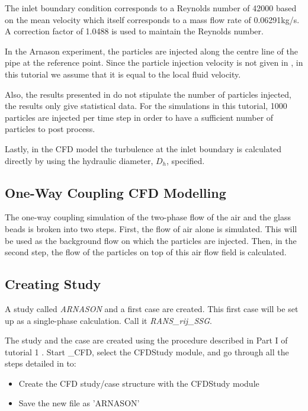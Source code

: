 The inlet boundary condition corresponds to a Reynolds number of 42000 based on the mean velocity which itself corresponds to a mass flow rate of 0.06291kg/s.  A correction factor of 1.0488 is used to maintain the Reynolds number.

In the Arnason experiment, the particles are injected along the centre line of the pipe at the reference point.  Since the particle injection velocity is not given in \cite{Arnason}, in this tutorial we assume that it is equal to the local fluid velocity.

Also, the results presented in \cite{Arnason} do not stipulate the number of particles injected, the results only give statistical data.  For the simulations in this tutorial, 1000 particles are injected per time step in order to have a sufficient number of particles to post process.

Lastly, in the CFD model the turbulence at the inlet boundary is calculated directly by \CS using the hydraulic diameter, $D_h$, specified.

\subsection{One-Way Coupling CFD Modelling}\label{lag:one_way}

The one-way coupling simulation of the two-phase flow of the air and the glass beads is broken into two steps.  First, the flow of air alone is simulated.  This will be used as the background flow on which the particles are injected.  Then, in the second step, the flow of the particles on top of this air flow field is calculated.

\subsection{Creating \CS Study}\label{lag:create_CS_struct}

A \CS study called \textit{ARNASON} and a first case are created. This first case will be set up as a single-phase calculation. Call it \textit{RANS\_rij\_SSG}.

The study and the case are created using the procedure described in Part I of tutorial 1 \cite{ShearDriven_Tuto}.  Start \salome\_CFD, select the CFDStudy module, and go through all the steps detailed in \cite{ShearDriven_Tuto} to:

\begin{itemize}
\item Create the CFD study/case structure with the CFDStudy module
\item Save the new file as 'ARNASON'
\end{itemize}


